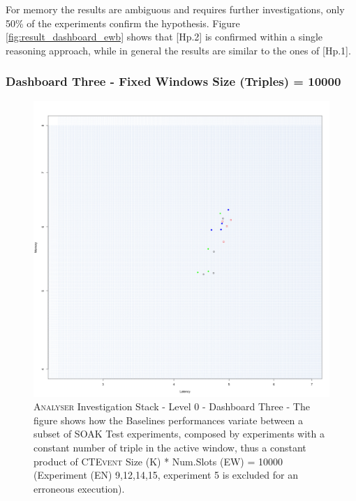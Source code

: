 For memory the results are ambiguous and requires further investigations, only 50\% of the experiments confirm the hypothesis. Figure \ref{fig:result_dashboard_ewb} shows that [Hp.2] is confirmed within a single reasoning approach, while in general the results are similar to the ones of [Hp.1].

\subsubsection{Dashboard Three - Fixed Windows Size (Triples) = 10000 } 

\begin{figure}[h!tbp]
	\centering
	\includegraphics[width=0.85\linewidth]{images/dashboard-3}	
	\caption[\textsc{Analyser} Investigation Stack - Level 0 - Dashboard Three - Multiplot Version]	{\textsc{Analyser} Investigation Stack - Level 0 - Dashboard Three - The figure shows how the Baselines performances variate between a subset of SOAK Test experiments, composed by experiments with a constant number of triple in the active window, thus a constant product of \textsc{CTEvent} Size (K) * Num.Slots (EW) = 10000 (Experiment (EN) 9,12,14,15, experiment 5 is excluded for an erroneous execution).}
	\label{fig:result_dashboard_probb}
\end{figure}

